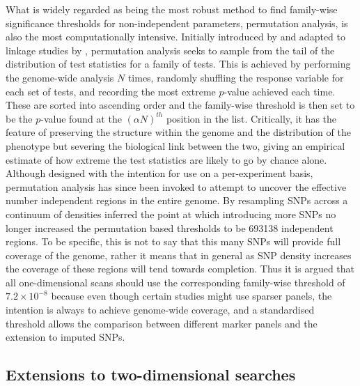What is widely regarded as being the most robust method to find family-wise significance thresholds for non-independent parameters, permutation analysis, is also the most computationally intensive. Initially introduced by \citet{Fisher1935} and adapted to linkage studies by \citet{Churchill1994a}, permutation analysis seeks to sample from the tail of the distribution of test statistics for a family of tests. This is achieved by performing the genome-wide analysis $N$ times, randomly shuffling the response variable for each set of tests, and recording the most extreme $p$-value achieved each time. These are sorted into ascending order and the family-wise threshold is then set to be the $p$-value found at the $(\alpha N)^{th}$ position in the list. Critically, it has the feature of preserving the structure within the genome and the distribution of the phenotype but severing the biological link between the two, giving an empirical estimate of how extreme the test statistics are likely to go by chance alone. Although designed with the intention for use on a per-experiment basis, permutation analysis has since been invoked to attempt to uncover the effective number independent regions in the entire genome. By resampling SNPs across a continuum of densities \citet{Dudbridge2008} inferred the point at which introducing more SNPs no longer increased the permutation based thresholds to be 693138 independent regions. To be specific, this is not to say that this many SNPs will provide full coverage of the genome, rather it means that in general as SNP density increases the coverage of these regions will tend towards completion. Thus it is argued that all one-dimensional scans should use the corresponding family-wise threshold of $7.2\times10^{-8}$ because even though certain studies might use sparser panels, the intention is always to achieve genome-wide coverage, and a standardised threshold allows the comparison between different marker panels and the extension to imputed SNPs.


\subsection{Extensions to two-dimensional searches}

